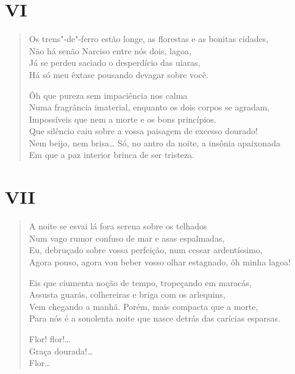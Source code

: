 \medskip
\section*{VI}

\begin{verse}
Os trens"-de"-ferro estão longe, as florestas e as bonitas cidades,\\
Não há senão Narciso entre nós dois, lagoa,\\
Já se perdeu saciado o desperdício das uiaras,\\
Há só meu êxtase pousando devagar sobre você.

Ôh que pureza sem impaciência nos calma\\
Numa fragrância imaterial, enquanto os dois corpos se agradam,\\
Impossíveis que nem a morte e os bons princípios.\\
Que silêncio caiu sobre a vossa paisagem de excesso dourado!\\
Nem beijo, nem brisa\ldots{} Só, no antro da noite, a insônia apaixonada\\
Em que a paz interior brinca de ser tristeza.
\end{verse}

\medskip
\section*{VII}

\begin{verse}
A noite se esvai lá fora serena sobre os telhados\\
Num vago rumor confuso de mar e asas espalmadas,\\
Eu, debruçado sobre vossa perfeição, num cessar ardentíssimo,\\
Agora pouso, agora vou beber vosso olhar estagnado, ôh minha lagoa!

Eis que ciumenta noção de tempo, tropeçando em maracás,\\
Assusta guarás, colhereiras e briga com os arlequins,\\
Vem chegando a manhã. Porém, mais compacta que a morte,\\
Para nós é a sonolenta noite que nasce detrás das carícias esparsas.

Flor! flor!\ldots{}\\
\qquad\qquad Graça dourada!\ldots{}\\
\qquad\qquad\qquad\qquad\qquad\quad Flor\ldots{}
\end{verse}

